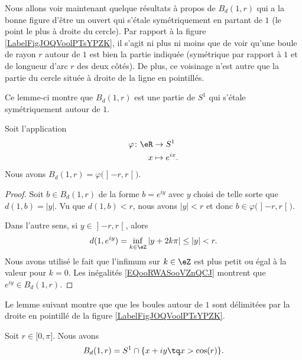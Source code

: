 Nous allons voir maintenant quelque résultats à propos de \(B_d(1,r)\) qui a la bonne figure d'être un ouvert qui s'étale symétriquement en partant de \( 1\) (le point le plus à droite du cercle). Par rapport à la figure \ref{LabelFigJOQVoolPTsYPZK}, il s'agit ni plus ni moins que de voir qu'une boule de rayon \( r\) autour de \( 1\) est bien la partie indiquée (symétrique par rapport à \( 1\) et de longueur d'arc \( r\) des deux côtés). De plus, ce voisinage n'est autre que la partie du cercle située à droite de la ligne en pointillés.
\newcommand{\CaptionFigJOQVoolPTsYPZK}{Un voisinage de \( 1\) dans \( S^1\).}


Ce lemme-ci montre que \( B_d(1,r)\) est une partie de \( S^1\) qui s'étale symétriquement autour de \( 1\).
\begin{lemma}       \label{LEMooMYNVooIWWsiV}
    Soit l'application
    \begin{equation}
        \begin{aligned}
            \varphi\colon \eR&\to S^1 \\
            x&\mapsto  e^{ix}.
        \end{aligned}
    \end{equation}
    Nous avons \( B_d(1,r)=\varphi\big( \mathopen] -r , r \mathclose[ \big)\).
\end{lemma}

\begin{proof}
    Soit \( b\in B_d(1,r)\) de la forme \( b= e^{iy}\) avec \( y\) choisi de telle sorte que \( d(1,b)=| y |\). Vu que \( d(1,b)<r\), nous avons \( | y |<r\) et donc \( b\in \varphi\big( \mathopen] -r , r \mathclose[ \big)\).

    Dans l'autre sens, si \( y\in\mathopen] -r , r \mathclose[\), alors
        \begin{equation}        \label{EQooRWASooVZnQCJ}
            d(1, e^{iy})=\inf_{k\in \eZ}| y+2k\pi |\leq | y |<r.
        \end{equation}
        Nous avons utilisé le fait que l'infimum sur \( k\in \eZ\) est plus petit ou égal à la valeur pour \( k=0\). Les inégalités \eqref{EQooRWASooVZnQCJ} montrent que \(  e^{iy}\in B_d(1,r)\).
\end{proof}

Le lemme suivant montre que que les boules autour de \( 1\) sont délimitées par la droite en pointillé de la figure \ref{LabelFigJOQVoolPTsYPZK}.
\begin{lemma}       \label{LEMooLINCooHJmJWx}
    Soit \( r\in \mathopen[ 0 , \pi \mathclose]\). Nous avons
    \begin{equation}
        B_d(1,r)=S^1\cap\{x+iy\tq x>\cos(r)\}.
    \end{equation}
\end{lemma}

